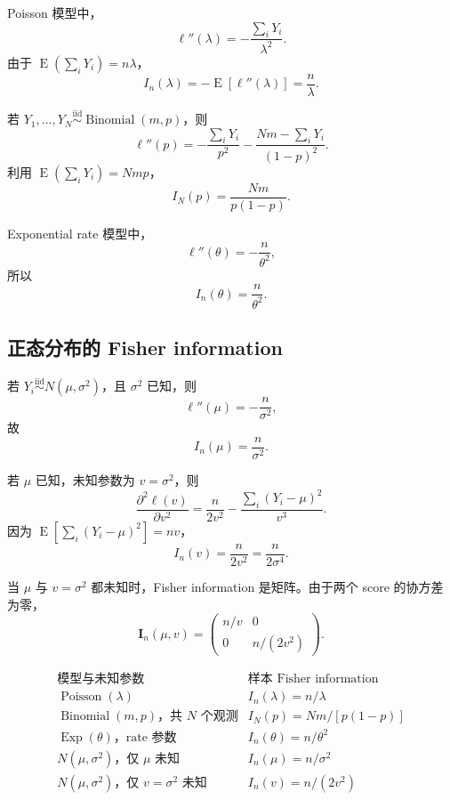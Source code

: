 \documentclass[11pt,a4paper]{article}
\theoremstyle{definition}
\theoremstyle{plain}
\theoremstyle{remark}
\newcommand{\E}{\operatorname{E}}
\begin{document}
Poisson 模型中，
\[
    \ell''(\lambda)=-\frac{\sum_iY_i}{\lambda^2}.
\]
由于 $\E(\sum_iY_i)=n\lambda$，
\[
    I_n(\lambda)
    =
    -\E[\ell''(\lambda)]
    =
    \frac{n}{\lambda}.
\]

若 $Y_1,\ldots,Y_N\overset{\mathrm{iid}}{\sim}\operatorname{Binomial}(m,p)$，则
\[
    \ell''(p)
    =
    -\frac{\sum_iY_i}{p^2}
    -\frac{Nm-\sum_iY_i}{(1-p)^2}.
\]
利用 $\E(\sum_iY_i)=Nmp$，
\[
    I_N(p)
    =
    \frac{Nm}{p(1-p)}.
\]

Exponential rate 模型中，
\[
    \ell''(\theta)=-\frac{n}{\theta^2},
\]
所以
\[
    I_n(\theta)=\frac{n}{\theta^2}.
\]

\subsection{正态分布的 Fisher information}

若 $Y_i\overset{\mathrm{iid}}{\sim}N(\mu,\sigma^2)$，且 $\sigma^2$ 已知，则
\[
    \ell''(\mu)=-\frac{n}{\sigma^2},
\]
故
\[
    I_n(\mu)=\frac{n}{\sigma^2}.
\]

若 $\mu$ 已知，未知参数为 $v=\sigma^2$，则
\[
    \frac{\partial^2\ell(v)}{\partial v^2}
    =
    \frac{n}{2v^2}
    -
    \frac{\sum_i(Y_i-\mu)^2}{v^3}.
\]
因为 $\E[\sum_i(Y_i-\mu)^2]=nv$，
\[
    I_n(v)
    =
    \frac{n}{2v^2}
    =
    \frac{n}{2\sigma^4}.
\]

当 $\mu$ 与 $v=\sigma^2$ 都未知时，Fisher information 是矩阵。由于两个 score 的协方差为零，
\[
    \boldsymbol I_n(\mu,v)
    =
    \begin{pmatrix}
        n/v & 0\\
        0 & n/(2v^2)
    \end{pmatrix}.
\]

\begin{memorybox}
\[
\boxed{
\begin{array}{c|c}
\text{模型与未知参数} & \text{样本 Fisher information}\\
\hline
\operatorname{Poisson}(\lambda) & I_n(\lambda)=n/\lambda\\[2pt]
\operatorname{Binomial}(m,p)\text{，共 }N\text{ 个观测} & I_N(p)=Nm/[p(1-p)]\\[2pt]
\operatorname{Exp}(\theta)\text{，rate 参数} & I_n(\theta)=n/\theta^2\\[2pt]
N(\mu,\sigma^2)\text{，仅 }\mu\text{ 未知} & I_n(\mu)=n/\sigma^2\\[2pt]
N(\mu,\sigma^2)\text{，仅 }v=\sigma^2\text{ 未知} & I_n(v)=n/(2v^2)
\end{array}
}
\]
\end{memorybox}
\end{document}
